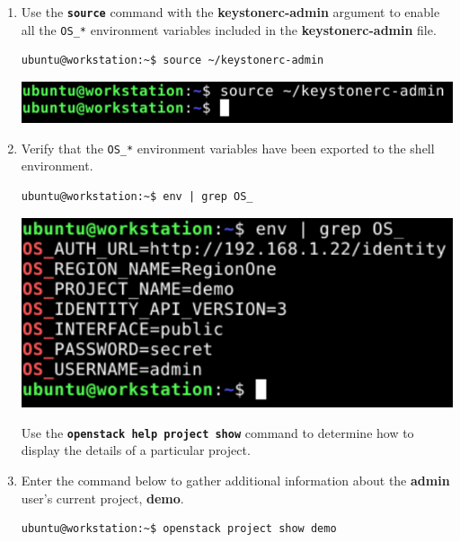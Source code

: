 \documentclass[letterpaper, 12pt]{article}
\begin{document}
\begin{enumerate}
    \item Use the \textbf{\texttt{source}} command with the \textbf{keystonerc-admin} argument to enable all the
    \texttt{OS\_*} environment variables included in the \textbf{keystonerc-admin} file.
\begin{lstlisting}
ubuntu@workstation:~$ source ~/keystonerc-admin
\end{lstlisting}

    \begin{center}
        \includegraphics[width=\linewidth]{images/part2/step3.png}
    \end{center}

    \item Verify that the \texttt{OS\_*} environment variables have been exported to the shell environment.
\begin{lstlisting}
ubuntu@workstation:~$ env | grep OS_
\end{lstlisting}

    \begin{center}
        \includegraphics[width=\linewidth]{images/part2/step4.png}
    \end{center}

    \begin{tipbox}{}
        Use the \textbf{\texttt{openstack help project show}} command to determine how to display the details of a
        particular project.
    \end{tipbox}

    \item Enter the command below to gather additional information about the \textbf{admin} user's current project,
    \textbf{demo}.
\begin{lstlisting}
ubuntu@workstation:~$ openstack project show demo
\end{lstlisting}


\end{enumerate}
\end{document}
